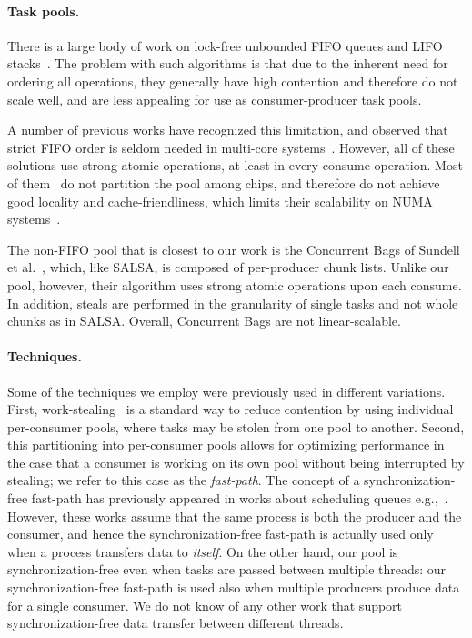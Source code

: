 \paragraph{Task pools.}
There is a large body of work on lock-free unbounded FIFO queues and LIFO
stacks~\cite{Gidenstam:2010:CLQ:1940234.1940266,Hendler:2004:SLS:1007912.1007944,
Hoffman:2007:BQ:1782394.1782423, Michael:1996:SFP:248052.248106,Moir:2005:UEI:1073970.1074013}.
The problem with such algorithms is that due to the inherent need for ordering all operations, they
generally have high contention and therefore do not scale well, and are less appealing for use as 
consumer-producer task pools. 

A number of previous works have recognized this limitation, and observed that strict FIFO
order is seldom needed in multi-core systems~\cite{Afek:2010:SPP:1885276.1885295,springerlink:10.1007/978-3-642-17653-1_29,
Basin:2011:CST:2075029.2075087,Sundell:2011:LAC:1989493.1989550}. However, all of these solutions
use strong atomic operations, at least in every consume operation. Most of
them~\cite{Afek:2010:SPP:1885276.1885295,springerlink:10.1007/978-3-642-17653-1_29,
Basin:2011:CST:2075029.2075087} do not partition the pool among chips, and therefore do not achieve
good locality and cache-friendliness, which limits their scalability on NUMA systems~\cite{Basin:Thesis:2011}.

The non-FIFO pool that is closest to our work is the Concurrent Bags of
Sundell et al.~\cite{Sundell:2011:LAC:1989493.1989550}, which, like SALSA, is composed of
per-producer chunk lists. Unlike our pool, however, their algorithm uses strong atomic operations
upon each consume. In addition, steals are performed in the granularity of single tasks and
not whole chunks as in SALSA. Overall, Concurrent Bags are not linear-scalable.

\paragraph{Techniques.}
Some of the techniques we employ were previously used in different
variations. First, work-stealing~\cite{Blumofe:1999:SMC:324133.324234} is a standard way to reduce
contention by using individual per-consumer pools, where tasks may be stolen from one pool to
another. Second, this partitioning into per-consumer pools allows for optimizing performance in the
case that a consumer is working on its own pool without being interrupted by stealing; we refer to
this case as the \emph{fast-path}. The concept of a synchronization-free fast-path has previously
appeared in works about scheduling queues
e.g.,~\cite{Arora:1998:TSM:277651.277678,Hendler:2006:DNW:1160290.1160294}. However, these works
assume that the same process is both the producer and the consumer, and hence the
synchronization-free fast-path is actually used only when a process transfers data to \emph{itself}.
On the other hand, our pool is synchronization-free even when tasks are passed between multiple
threads: our synchronization-free fast-path is used also when multiple producers produce data for
a single consumer. We do not know of any other work that support synchronization-free data
transfer between different threads.

